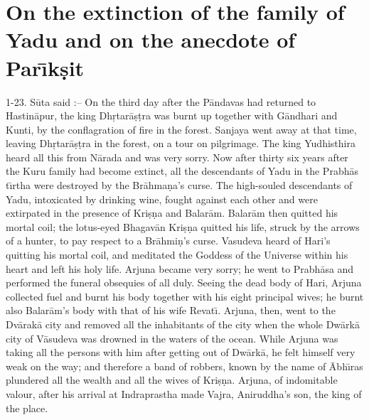 \chapter{On the extinction of the family of Yadu and on the anecdote of Par\={\i}k\d{s}it}

1-23. S\=uta said :-- On the third day after the P\=andavas had returned to Hastin\=apur, the king Dh\d{r}tar\=a\d{s}\d{t}ra was burnt up together with G\=andhari and Kunti, by the conflagration of fire in the forest. Sanjaya went away at that time, leaving Dh\d{r}tar\=a\d{s}\d{t}ra in the forest, on a tour on pilgrimage. The king Yudhisthira heard all this from N\=arada and was very sorry. Now after thirty six years after the Kuru family had become extinct, all the descendants of Yadu in the Prabh\=as t\={\i}rtha were destroyed by the Br\=ahma\d{n}a's curse. The high-souled descendants of Yadu, intoxicated by drinking wine, fought against each other and were extirpated in the presence of Kri\d{s}\d{n}a and Balar\=am. Balar\=am then quitted his mortal coil; the lotus-eyed Bhagav\=an Kri\d{s}\d{n}a quitted his life, struck by the arrows of a hunter, to pay respect to a Br\=ahmi\d{n}'s curse. Vasudeva heard of Hari's quitting his mortal coil, and meditated the Goddess of the Universe within his heart and left his holy life. Arjuna became very sorry; he went to Prabh\=asa and performed the funeral obsequies of all duly. Seeing the dead body of Hari, Arjuna collected fuel and burnt his body together with his eight principal wives; he burnt also Balar\=am's body with that of his wife Revat\={\i}. Arjuna, then, went to the Dv\=arak\=a city and removed all the inhabitants of the city when the whole Dw\=ark\=a city of V\=asudeva was drowned in the waters of the ocean. While Arjuna was taking all the persons with him after getting out of Dw\=ark\=a, he felt himself very weak on the way; and therefore a band of robbers, known by the name of \=Abh\={\i}ras plundered all the wealth and all the wives of Kri\d{s}\d{n}a. Arjuna, of indomitable valour, after his arrival at Indraprastha made Vajra, Aniruddha's son, the king of the place.

